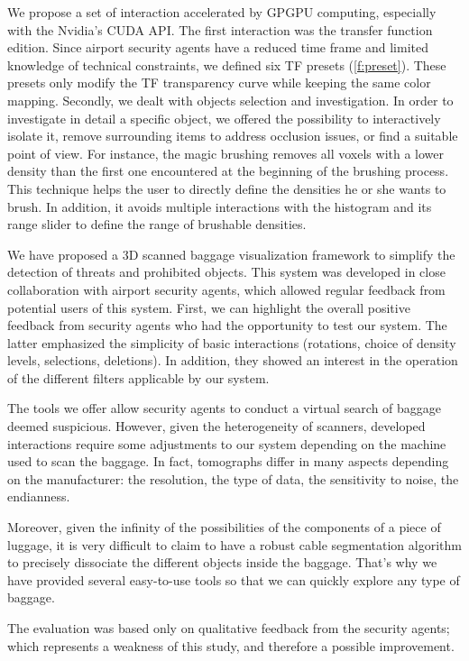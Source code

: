 We propose a set of interaction accelerated by GPGPU computing, especially with the Nvidia's CUDA API. The first interaction was the transfer function edition. Since airport security agents have a reduced time frame and limited knowledge of technical constraints, we defined six TF presets (\autoref{f:preset}). These presets only modify the TF transparency curve while keeping the same color mapping. Secondly, we dealt with objects selection and investigation. In order to investigate in detail a specific object, we offered the possibility to interactively isolate it, remove surrounding items to address occlusion issues, or find a suitable point of view. For instance,
the magic brushing removes all voxels with a lower density than the first one encountered at the beginning of the brushing process. This technique helps the user to directly define the densities he or she wants to brush. In addition, it avoids multiple interactions with the histogram and its range slider to define the range of brushable densities.


We have proposed a 3D scanned baggage visualization framework to simplify the detection of threats and prohibited objects. This system was developed in close collaboration with airport security agents, which allowed regular feedback from potential users of this system.
First, we can highlight the overall positive feedback from security agents who had the opportunity to test our system. The latter emphasized the simplicity of basic interactions (rotations, choice of density levels, selections, deletions). In addition, they showed an interest in the operation of the different filters applicable by our system.

The tools we offer allow security agents to conduct a virtual search of baggage deemed suspicious. However, given the heterogeneity of scanners, developed interactions require some adjustments to our system depending on the machine used to scan the baggage. In fact, tomographs differ in many aspects depending on the manufacturer: the resolution, the type of data, the sensitivity to noise, the endianness.

Moreover, given the infinity of the possibilities of the components of a piece of luggage, it is very difficult to claim to have a robust cable segmentation algorithm to precisely dissociate the different objects inside the baggage. That's why we have provided several easy-to-use tools so that we can quickly explore any type of baggage.


The evaluation was based only on qualitative feedback from the security agents; which represents a weakness of this study, and therefore a possible improvement.

